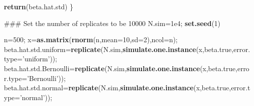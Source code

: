 \documentclass[12pt,]{book}
\newenvironment{Shaded}{\begin{snugshade}}{\end{snugshade}}
\newcommand{\KeywordTok}[1]{\textcolor[rgb]{0.13,0.29,0.53}{\textbf{#1}}}
\newcommand{\DataTypeTok}[1]{\textcolor[rgb]{0.13,0.29,0.53}{#1}}
\newcommand{\DecValTok}[1]{\textcolor[rgb]{0.00,0.00,0.81}{#1}}
\newcommand{\FloatTok}[1]{\textcolor[rgb]{0.00,0.00,0.81}{#1}}
\newcommand{\StringTok}[1]{\textcolor[rgb]{0.31,0.60,0.02}{#1}}
\newcommand{\NormalTok}[1]{#1}
\begin{document}
\begin{Shaded}
\begin{Highlighting}[]
  \KeywordTok{return}\NormalTok{(beta.hat.std)}
\NormalTok{\}}

\NormalTok{### Set the number of replicates to be 10000}
\NormalTok{N.sim=}\FloatTok{1e4}\NormalTok{;}
\KeywordTok{set.seed}\NormalTok{(}\DecValTok{1}\NormalTok{)}

\NormalTok{n=}\DecValTok{500}\NormalTok{;}
\NormalTok{x=}\KeywordTok{as.matrix}\NormalTok{(}\KeywordTok{rnorm}\NormalTok{(n,}\DataTypeTok{mean=}\DecValTok{10}\NormalTok{,}\DataTypeTok{sd=}\DecValTok{2}\NormalTok{),}\DataTypeTok{ncol=}\NormalTok{n);}
\NormalTok{beta.hat.std.uniform=}\KeywordTok{replicate}\NormalTok{(N.sim,}\KeywordTok{simulate.one.instance}\NormalTok{(x,beta.true,}\DataTypeTok{error.type=}\StringTok{'uniform'}\NormalTok{));}
\NormalTok{beta.hat.std.Bernoulli=}\KeywordTok{replicate}\NormalTok{(N.sim,}\KeywordTok{simulate.one.instance}\NormalTok{(x,beta.true,}\DataTypeTok{error.type=}\StringTok{'Bernoulli'}\NormalTok{));}
\NormalTok{beta.hat.std.normal=}\KeywordTok{replicate}\NormalTok{(N.sim,}\KeywordTok{simulate.one.instance}\NormalTok{(x,beta.true,}\DataTypeTok{error.type=}\StringTok{'normal'}\NormalTok{));}
\end{Highlighting}
\end{Shaded}
\end{document}
